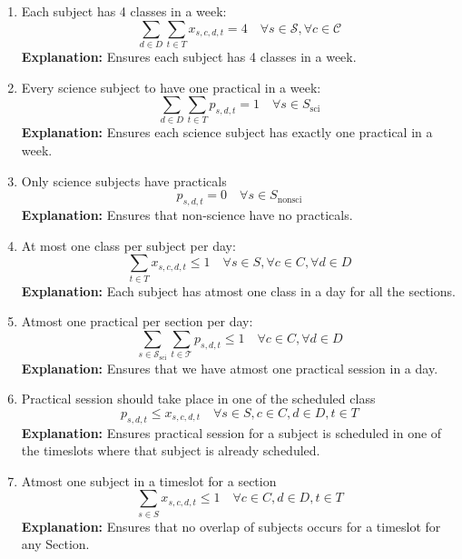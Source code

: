 \documentclass[11pt]{article}
\begin{document}
\begin{enumerate}
    \item Each subject has 4 classes in a week:
    \[
    \sum_{d \in D} \sum_{t \in T} x_{s,c,d,t} = 4 \quad \forall s \in \mathcal{S}, \forall c \in \mathcal{C}
    \]
    \textbf{Explanation:} Ensures each subject has 4 classes in a week.

    \item Every science subject to have one practical in a week:
    \[
    \sum_{d \in D}\sum_{t \in T} p_{s,d,t} = 1 \quad \forall s \in S_{\text{sci}}
    \]
    \textbf{Explanation:} Ensures each science subject has exactly one practical in a week.

    \item Only science subjects have practicals
    \[
    p_{s,d,t} = 0 \quad \forall s \in S_{\text{nonsci}}
    \]
    \textbf{Explanation:} Ensures that non-science have no practicals.
    
    \item At most one class per subject per day:
    \[
    \sum_{t \in T} x_{s,c,d,t} \leq 1 \quad \forall s \in S, \forall c \in C, \forall d \in D
    \]
    \textbf{Explanation:} Each subject has atmost one class in a day for all the sections.

    \item Atmost one practical per section per day:
    \[
    \sum_{s \in \mathcal{S}_\text{sci}} \sum_{t \in \mathcal{T}} p_{s,d,t} \leq 1 \quad \forall c \in C, \forall d \in D
    \]
    \textbf{Explanation:} Ensures that we have atmost one practical session in a day.

    
    \item Practical session should take place in one of the scheduled class
    \[
        p_{s,d,t} \leq x_{s,c,d,t} \quad \forall s \in S, c \in C, d \in D, t \in T
    \]
    \textbf{Explanation:} Ensures practical session for a subject is scheduled in one of the timeslots where that subject is already scheduled.  

    \item Atmost one subject in a timeslot for a section
    \[
        \sum_{s \in S} x_{s,c,d,t} \leq 1 \quad \forall c \in C, d \in D, t \in T
    \]
    \textbf{Explanation:} Ensures that no overlap of subjects occurs for a timeslot for any Section.


\end{enumerate}
\end{document}
